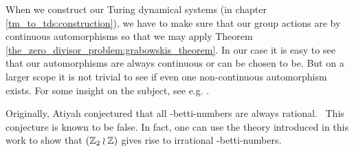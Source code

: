 \begin{Remark}
	\label{remarks:continuous_group_automorphisms}
	When we construct our Turing dynamical systems (in chapter \ref{tm_to_tds:construction}), we have to make sure that our group actions are by continuous automorphisms so that we may apply Theorem \ref{the_zero_divisor_problem:grabowskis_theorem}.
	In our case it is easy to see that our automorphisms are always continuous or can be chosen to be.
	But on a larger scope it is not trivial to see if even one non-continuous automorphism exists. For some insight on the subject, see e.g. \cite{bhk16}.
\end{Remark}

\begin{Remark}
	\label{remarks:atiyah-conjecture}
	Originally, Atiyah conjectured that all \ltwo-betti-numbers are always rational.\footnotemark~
	This conjecture is known to be false.
	In fact, one can use the theory introduced in this work to show that $(\mathbb{Z}_2 \wr \mathbb{Z})$ gives rise to irrational \ltwo-betti-numbers.
\end{Remark}
